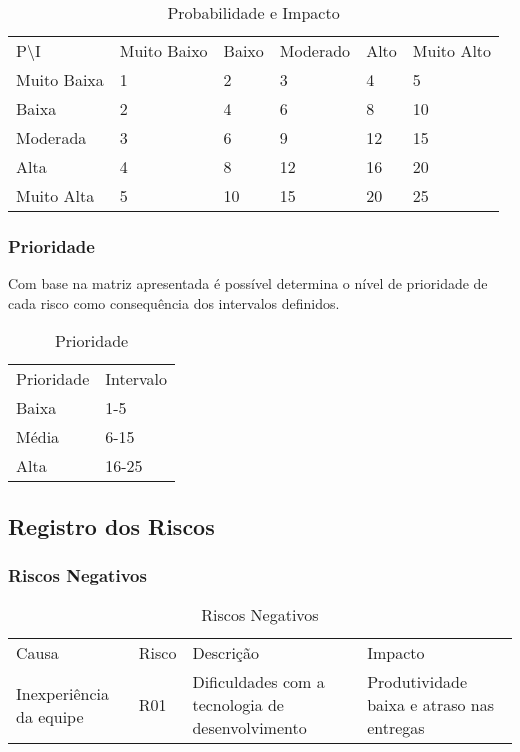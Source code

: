 \begin{table}[htp]
\centering
\caption{Probabilidade e Impacto}
\label{probabilidade-impacto}
\begin{tabular}{llllll}
P\textbackslash I         & Muito Baixo & Baixo & Moderado & Alto & Muito Alto \\
Muito Baixa & 1           & 2     & 3        & 4    & 5          \\
Baixa       & 2           & 4     & 6        & 8    & 10         \\
Moderada    & 3           & 6     & 9        & 12   & 15         \\
Alta        & 4           & 8     & 12       & 16   & 20         \\
Muito Alta  & 5           & 10    & 15       & 20   & 25        
\end{tabular}
\end{table}

\subsubsection{Prioridade}
Com base na matriz apresentada é possível determina o nível de prioridade de cada risco como consequência dos intervalos definidos.

\begin{table}[htp]
\centering
\caption{Prioridade}
\label{prioridade}
\begin{tabular}{ll}
Prioridade & Intervalo \\
Baixa      & 1-5       \\
Média      & 6-15      \\
Alta       & 16-25    
\end{tabular}
\end{table}

\subsection{Registro dos Riscos}
\subsubsection{Riscos Negativos}

\begin{table}[htp]
\centering
\caption{Riscos Negativos}
\label{riscos-negativos}
\begin{tabular}{llll}
Causa                   & Risco & Descrição                                        & Impacto                                   \\
Inexperiência da equipe & R01   & Dificuldades com a tecnologia de desenvolvimento & Produtividade baixa e atraso nas entregas
\end{tabular}
\end{table}

